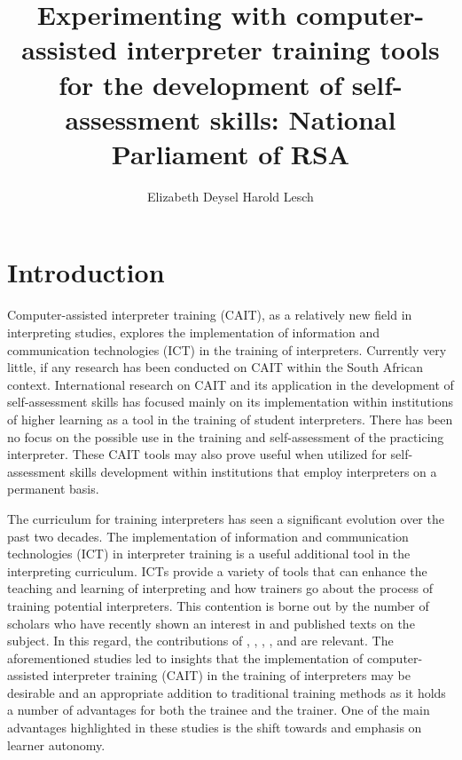 \documentclass[output=paper]{langsci/langscibook}
\author{%
 Elizabeth Deysel\affiliation{National Parliament of South Africa}\lastand%
 Harold Lesch\affiliation{University of Stellenbosch}
}
\title{Experimenting with computer-assisted interpreter training tools for the development of self-assessment skills: National Parliament of RSA}
\begin{document}
\section{Introduction} 
Computer-assisted interpreter training (\textsc{CAIT}), as a relatively new field in interpreting studies, explores the implementation of information and communication technologies (\textsc{ICT}) in the training of interpreters. Currently very little, if any research has been conducted on \textsc{CAIT} within the South African context. International research on \textsc{CAIT} and its application in the development of self-assessment skills has focused mainly on its implementation within institutions of higher learning as a tool in the training of student interpreters. There has been no focus on the possible use in the training and self-assessment of the practicing interpreter. These \textsc{CAIT} tools may also prove useful when utilized for self-assessment skills development within institutions that employ interpreters on a permanent basis.  

The curriculum for training interpreters has seen a significant evolution over the past two decades. The implementation of information and communication technologies (\textsc{ICT}) in interpreter training is a useful additional tool in the interpreting curriculum. \textsc{ICT}s provide a variety of tools that can enhance the teaching and learning of interpreting and how trainers go about the process of training potential interpreters. This contention is borne out by the number of scholars who have recently shown an interest in and published texts on the subject. In this regard, the contributions of \citet{Lim2014}, \citet{Pinazo2008}, \citet{Gorm2007}, \citet{Sandrelli2007b}, \citet{Lee2005} and \citet{Sandrelli2015, Sandrelli2007b, Sandrelli2002} are relevant. The aforementioned studies led to insights that the implementation of computer-assisted interpreter training (\textsc{CAIT}) in the training of interpreters may be desirable and an appropriate addition to traditional training methods as it holds a number of advantages for both the trainee and the trainer. One of the main advantages highlighted in these studies is the shift towards and emphasis on learner autonomy. 
\end{document}
